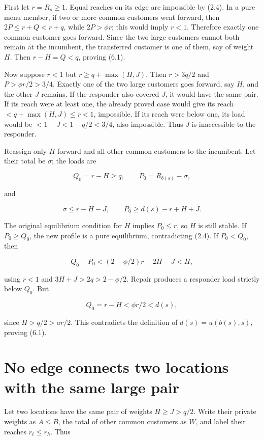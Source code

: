 \documentclass[11pt,a4paper]{article}
\begin{document}
First let \(r=R_s\ge1\). Equal reaches on its edge are impossible by (2.4). In a pure menu member, if two or more common customers went forward, then \(2P\le r+Q<r+q\), while \(2P>\phi r\); this would imply \(r<1\). Therefore exactly one common customer goes forward. Since the two large customers cannot both remain at the incumbent, the transferred customer is one of them, say of weight \(H\). Then \(r-H=Q<q\), proving (6.1).

Now suppose \(r<1\) but \(r\ge q+\max(H,J)\). Then \(r>3q/2\) and \(P>\phi r/2>3/4\). Exactly one of the two large customers goes forward, say \(H\), and the other \(J\) remains. If the responder also covered \(J\), it would have the same pair. If its reach were at least one, the already proved case would give its reach \(<q+\max(H,J)\le r<1\), impossible. If its reach were below one, its load would be \(<1-J<1-q/2<3/4\), also impossible. Thus \(J\) is inaccessible to the responder.

Reassign only \(H\) forward and all other common customers to the incumbent. Let their total be \(\sigma\); the loads are

\[
Q_0=r-H\ge q,\qquad P_0=R_{b(s)}-\sigma,
\]

and

\[
\sigma\le r-H-J,\qquad P_0\ge d(s)-r+H+J.
\]

The original equilibrium condition for \(H\) implies \(P_0\le r\), so \(H\) is still stable. If \(P_0\ge Q_0\), the new profile is a pure equilibrium, contradicting (2.4). If \(P_0<Q_0\), then

\[
Q_0-P_0<(2-\phi/2)r-2H-J<H,
\]

using \(r<1\) and \(3H+J>2q>2-\phi/2\). Repair produces a responder load strictly below \(Q_0\). But

\[
Q_0=r-H<\phi r/2<d(s),
\]

since \(H>q/2>ar/2\). This contradicts the definition of \(d(s)=u(b(s),s)\), proving (6.1).

\hypertarget{no-edge-connects-two-locations-with-the-same-large-pair}{%
\section{No edge connects two locations with the same large pair}\label{no-edge-connects-two-locations-with-the-same-large-pair}}

Let two locations have the same pair of weights \(H\ge J>q/2\). Write their private weights as \(A\le B\), the total of other common customers as \(W\), and label their reaches \(r_\ell\le r_h\). Thus
\end{document}
